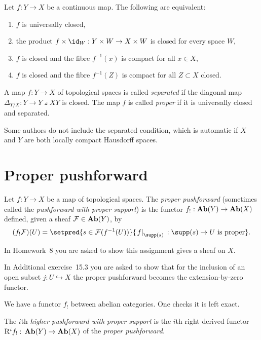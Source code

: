 \begin{prop}
	Let $f: Y \to X$ be a continuous map. The following are equivalent: 
	\begin{enumerate}
    	\item $f$ is universally closed,
		\item the product $f \times \id_W: Y \times W \to X \times W$ is closed for every space \(W\),
		\item $f$ is closed and the fibre $f^{-1}(x)$ is compact for all $x \in X$,
		\item $f$ is closed and the fibre $f^{-1}(Z)$ is compact for all $Z \subset X$ closed. 
    \end{enumerate}
\end{prop}

\begin{defn}
	A map $f: Y \to X$ of topological spaces is called \emph{separated} if the diagonal map $
    	\Delta_{Y/X}: Y \to Y\pullback{X} Y
    $ is closed. The map $f$ is called \emph{proper} if it is universally closed and separated. 
\end{defn}
\begin{rmk}
	Some authors do not include the separated condition, which is automatic if $X$ and $Y$ are both locally compact Hausdorff spaces.
\end{rmk}

\section{Proper pushforward}

\begin{defn}
	Let $f\colon Y \to X$ be a map of topological spaces. The \emph{proper pushforward} (sometimes called the \emph{pushforward with proper support}) is the functor $f_{!}: \operatorname{\mathbf{Ab}}(Y) \to \operatorname{\mathbf{Ab}}(X)$ defined, given a sheaf $\mathcal{F} \in \operatorname{\mathbf{Ab}}(Y)$, by \[
		(f_{!}\sh{F})(U) = \setpred{s \in \sh{F}(f^{-1}(U))}{\restr{f}{\supp(s)}\colon \supp(s) \to U \text{ is proper}}\text{.}
    \]
\end{defn}
\begin{rmk}
	In Homework~8 you are asked to show this assignment gives a sheaf on $X$. 
\end{rmk}
\begin{exmp}
	In Additional exercise~15.3 you are asked to show that for the inclusion of an open subset $j\colon U \hookrightarrow X$ the proper pushforward becomes the extension-by-zero functor.
\end{exmp}
We have a functor $f_!$ between abelian categories. One checks it is left exact. 
\begin{defn}
	The $i$th \emph{higher pushforward with proper support} is the \(i\)th right derived functor $\rightderived^if_!\colon \catAbelianSheaf(Y) \to \catAbelianSheaf(X)$ of the \emph{proper pushforward}.
\end{defn}

